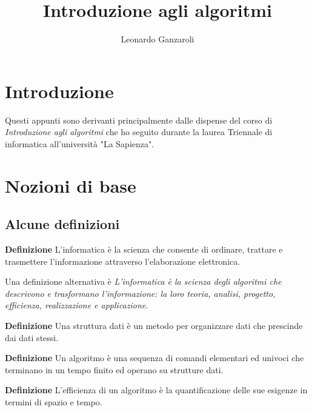 \documentclass{article}
\title{Introduzione agli algoritmi}
\author{Leonardo Ganzaroli}
\date{}
\begin{document}
\maketitle


\tableofcontents

\newpage

\hypersetup{allcolors=black}

\section*{Introduzione}

Questi appunti sono derivanti principalmente dalle dispense del corso di \textit{Introduzione agli algoritmi} che ho seguito durante la laurea Triennale di informatica all'università "La Sapienza".

\newpage

\section{Nozioni di base}

\subsection{Alcune definizioni}

\textbf{Definizione} L'informatica è la scienza che consente di ordinare, trattare e trasmettere l’informazione attraverso l’elaborazione elettronica.\newline

\noindent Una definizione alternativa è \textit{L’informatica è la scienza degli algoritmi che descrivono e trasformano l’informazione: la loro teoria, analisi,
progetto, efficienza, realizzazione e applicazione}.\newline

\noindent \textbf{Definizione} Una struttura dati è un metodo per organizzare dati che prescinde dai dati stessi.\newline

\noindent\textbf{Definizione} Un algoritmo è una sequenza di comandi elementari ed
univoci che terminano in un tempo finito ed operano su
strutture dati.\newline

\noindent \textbf{Definizione} L'efficienza di un algoritmo è la quantificazione delle sue esigenze in termini di spazio e tempo.\newline
\end{document}
